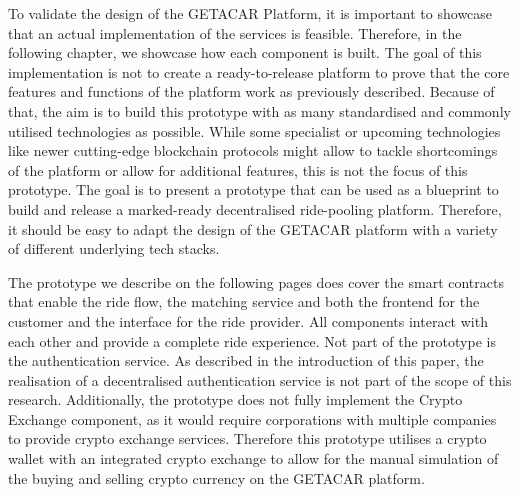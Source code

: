 To validate the design of the GETACAR Platform, it is important to showcase that an actual implementation of the services is feasible. Therefore, in the following chapter, we showcase how each component is built. The goal of this implementation is not to create a ready-to-release platform to prove that the core features and functions of the platform work as previously described. Because of that, the aim is to build this prototype with as many standardised and commonly utilised technologies as possible. While some specialist or upcoming technologies like newer cutting-edge blockchain protocols might allow to tackle shortcomings of the platform or allow for additional features, this is not the focus of this prototype. The goal is to present a prototype that can be used as a blueprint to build and release a marked-ready decentralised ride-pooling platform. Therefore, it should be easy to adapt the design of the GETACAR platform with a variety of different underlying tech stacks.

The prototype we describe on the following pages does cover the smart contracts that enable the ride flow, the matching service and both the frontend for the customer and the interface for the ride provider. All components interact with each other and provide a complete ride experience. Not part of the prototype is the authentication service. As described in the introduction of this paper, the realisation of a decentralised authentication service is not part of the scope of this research. Additionally, the prototype does not fully implement the Crypto Exchange component, as it would require corporations with multiple companies to provide crypto exchange services. Therefore this prototype utilises a crypto wallet with an integrated crypto exchange to allow for the manual simulation of the buying and selling crypto currency on the GETACAR platform.
